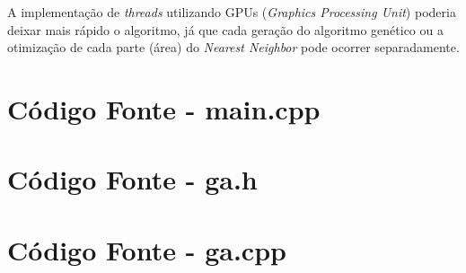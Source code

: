 \documentclass[12pt,openright,a4paper,twoside]{tcc}
\begin{document}
    A implementação de \textit{threads} utilizando GPUs (\textit{Graphics Processing Unit}) poderia deixar mais rápido o algoritmo, já que cada geração do algoritmo genético ou a otimização de cada parte (área) do \textit{Nearest Neighbor} pode ocorrer separadamente.
    
	\postextual
	

	\apendices
	\chapter{Código Fonte - main.cpp}
	
	\chapter{Código Fonte - ga.h}
	
	\chapter{Código Fonte - ga.cpp}
	
\end{document}
